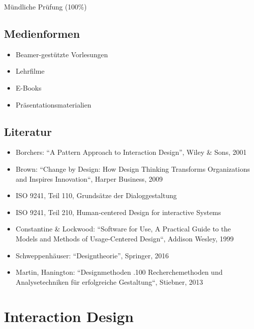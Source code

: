 Mündliche Prüfung (100\%)

\section*{Medienformen\label{/mi-2017/modulbeschreibungen-master/MA_HCI_Design_Methodologies}}\label{medienformenpathlabelmi-2017modulbeschreibungen-mastermaux5fhciux5fdesignux5fmethodologies}

\begin{itemize}
\tightlist
\item
  Beamer-gestützte Vorlesungen
\item
  Lehrfilme
\item
  E-Books
\item
  Präsentationsmaterialien
\end{itemize}

\section*{Literatur\label{/mi-2017/modulbeschreibungen-master/MA_HCI_Design_Methodologies}}\label{literaturpathlabelmi-2017modulbeschreibungen-mastermaux5fhciux5fdesignux5fmethodologies}

\begin{itemize}
\tightlist
\item
  Borchers: ``A Pattern Approach to Interaction Design'', Wiley \& Sons,
  2001
\item
  Brown: ``Change by Design: How Design Thinking Transforms
  Organizations and Inspires Innovation``, Harper Business, 2009
\item
  ISO 9241, Teil 110, Grundsätze der Dialoggestaltung
\item
  ISO 9241, Teil 210, Human-centered Design for interactive Systems
\item
  Constantine \& Lockwood: ``Software for Use, A Practical Guide to the
  Models and Methods of Usage-Centered Design``, Addison Wesley, 1999
\item
  Schweppenhäuser: ``Designtheorie'', Springer, 2016
\item
  Martin, Hanington: ``Designmethoden .100 Recherchemethoden und
  Analysetechniken für erfolgreiche Gestaltung``, Stiebner, 2013
\end{itemize}

\chapter{Interaction
Design\label{/mi-2017/modulbeschreibungen-master/MA_HCI_InteractionDesign}}\label{interaction-designpathlabelmi-2017modulbeschreibungen-mastermaux5fhciux5finteractiondesign}

